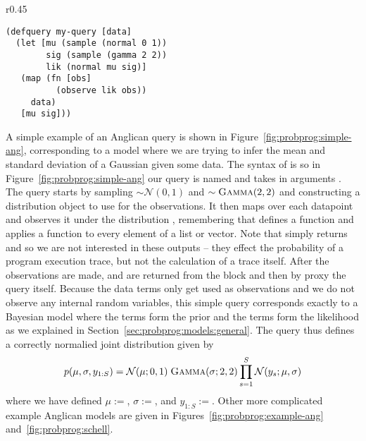\begin{wrapfigure}{r}{0.45\textwidth}
	\centering 
	\vspace{-10pt}
	\begin{lstlisting}[basicstyle=\ttfamily\small]
(defquery my-query [data]
  (let [mu (sample (normal 0 1))
        sig (sample (gamma 2 2))
        lik (normal mu sig)]
   (map (fn [obs]
          (observe lik obs))
     data)
   [mu sig]))
	\end{lstlisting}	
	\vspace{-5pt}
	\caption{A simple Anglican query.\label{fig:probprog:simple-ang}}
	\vspace{-10pt}
\end{wrapfigure}
A simple example of an Anglican query is shown in Figure~\ref{fig:probprog:simple-ang},
corresponding to a model where we are trying to infer the mean and standard deviation
of a Gaussian given some data.  The syntax of  is {\small {}}
so in Figure~\ref{fig:probprog:simple-ang} our query is named {\small {}} and takes
in arguments {\small {}}.  The query starts by sampling {\small {}}$\sim\mathcal{N}(0,1)$
and {\small {}}$\sim\textsc{Gamma}(2,2)$ and constructing a distribution object {\small {}}
to use for the observations.  It then maps over each datapoint and observes it under the distribution
{\small {}}, remembering that {\small {}} defines a function and \map applies a function
to every element of a list or vector.  
Note that \observe simply returns {\small {}} and so we
are not interested in these outputs -- they effect the probability of a program execution trace, but
not the calculation of a trace itself.  After the observations are made, {\small {}} and {\small {}}
are returned from the \cllet block and then by proxy the query itself.
Because the data terms only get used as observations and we do
not observe any internal random variables, this simple query corresponds exactly to a Bayesian model where
the \sample terms form the prior and the \observe terms form the likelihood as we explained in
Section~\ref{sec:probprog:models:general}.  The query thus defines a correctly normalied joint
distribution given by
\begin{align}
p(\mu,\sigma,y_{1:S}) = \mathcal{N}(\mu ; 0,1) \; \textsc{Gamma}(\sigma ; 2, 2) \prod_{s=1}^{S} \mathcal{N}(y_s ; \mu, \sigma)
\end{align}
where we have defined $\mu:=${\small {}}, $\sigma:=${\small {}}, and $y_{1:S}:=${\small {}}.
Other more complicated example Anglican models are given in Figures~\ref{fig:probprog:example-ang}
and~\ref{fig:probprog:schell}.

